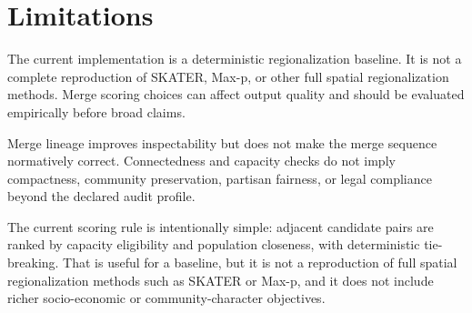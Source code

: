 \section{Limitations}

The current implementation is a deterministic regionalization baseline. It is
not a complete reproduction of SKATER, Max-p, or other full spatial
regionalization methods. Merge scoring choices can affect output quality and
should be evaluated empirically before broad claims.

Merge lineage improves inspectability but does not make the merge sequence
normatively correct. Connectedness and capacity checks do not imply compactness,
community preservation, partisan fairness, or legal compliance beyond the
declared audit profile.

The current scoring rule is intentionally simple: adjacent candidate pairs are
ranked by capacity eligibility and population closeness, with deterministic
tie-breaking. That is useful for a baseline, but it is not a reproduction of
full spatial regionalization methods such as SKATER or Max-p, and it does not
include richer socio-economic or community-character objectives.
